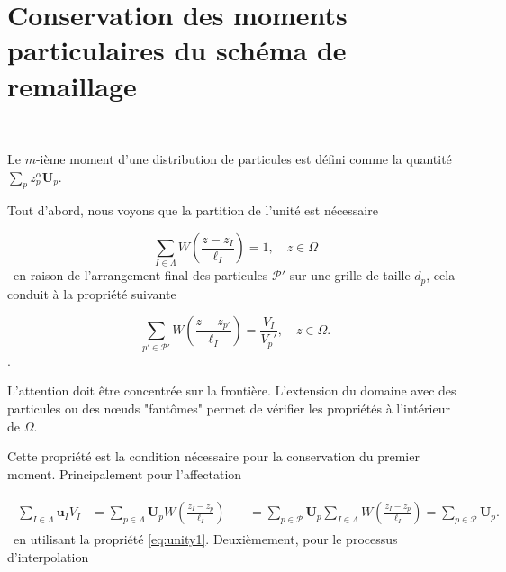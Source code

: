 
\appendix
\section{Conservation des moments particulaires du schéma de remaillage}~\label{appendix:moment_conservation}

Le $m$-ième moment d'une distribution de particules est défini comme la quantité $\sum_{p} z_p^{\alpha} \bm{U}_p$.

Tout d'abord, nous voyons que la partition de l'unité est nécessaire

\begin{equation}~\label{eq:unity1}
    \sum_{I \in \Lambda} W\left(\frac{z - z_I}{\ell_I}\right) = 1 ,\quad z \in \Omega
\end{equation}~en raison de l'arrangement final des particules $\mathcal{P'}$ sur une grille de taille $d_p$, cela conduit à la propriété suivante

\begin{equation}~\label{eq:unity2}
    \sum_{p'\in\mathcal P'} W\left(\frac{z - z_{p'}}{\ell_I}\right) = \frac{V_I}{V_p'},\quad z \in \Omega.
\end{equation}.

L'attention doit être concentrée sur la frontière. L'extension du domaine avec des particules ou des nœuds "fantômes" permet de vérifier les propriétés à l'intérieur de $\Omega$.

Cette propriété est la condition nécessaire pour la conservation du premier moment. Principalement pour l'affectation

\begin{gather}
    \begin{align*}
        \sum_{I \in \Lambda} \bm u_I V_I & = \sum_{p \in \Lambda} \bm U_p W \left(\frac{z_I - z_p}{\ell_I} \right)                                                            & \
                                         & = \sum_{p \in \mathcal P} \bm U_p \sum_{I \in \Lambda} W \left(\frac{z_I - z_p}{\ell_I} \right) = \sum_{p \in \mathcal P} \bm U_p. &
    \end{align*}
\end{gather}~en utilisant la propriété \eqref{eq:unity1}. Deuxièmement, pour le processus d'interpolation

